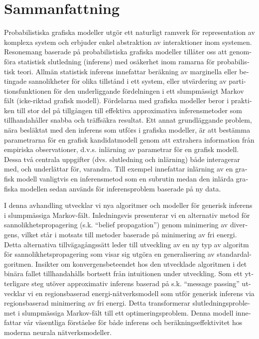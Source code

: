 \chapter{Sammanfattning}

\begin{otherlanguage}{swedish}
Probabilistiska grafiska modeller utgör ett naturligt ramverk för representation av komplexa system och erbjuder enkel abstraktion av interaktioner inom systemen.
Resonemang baserade på probabilistiska grafiska modeller tillåter oss att genomföra statistisk slutledning (inferens) med osäkerhet inom ramarna för probabilistisk teori. Allmän statistisk inferens innefattar beräkning av marginella eller betingade sannolikheter för olika tillstånd i ett system, eller utvärdering av partitionsfunktionen för den underliggande fördelningen i ett slumpmässigt Markov fält (icke-riktad grafisk modell). Fördelarna med grafiska modeller beror i praktiken till stor del på tillgången till effektiva approximativa inferensmetoder som tillhandahåller snabba och träffsäkra resultat. Ett annat grundläggande problem, nära besläktat med den inferens som utförs i grafiska modeller, är att bestämma parametrarna för en grafisk kandidatmodell genom att extrahera information från empiriska observationer, d.v.s. inlärning av parametrar för en grafisk modell. Dessa två centrala uppgifter (dvs. slutledning och inlärning) både interagerar med, och underlättar för, varandra. Till exempel innefattar inlärning av en grafisk modell vanligtvis en inferensmetod som en subrutin medan den inlärda grafiska modellen sedan används för inferensproblem baserade på ny data.

I denna avhandling utvecklar vi nya algoritmer och modeller för generisk inferens i slumpmässiga Markov-fält. Inledningsvis presenterar vi en alternativ metod för sannolikhetspropagering (s.k. ``belief propagation'') genom minimering av divergens, vilket står i motsats till metoder baserade på minimering av fri energi. Detta alternativa tillvägagångssätt leder till utveckling av en ny typ av algoritm för sannolikhetspropagering som visar sig utgöra en generalisering av standardalgoritmen. Insikter om konvergensbeteendet hos den utvecklade algoritmen i det binära fallet tillhandahålls bortsett från intuitionen under utveckling. Som ett ytterligare steg utöver approximativ inferens baserad på s.k. ``message passing'' utvecklar vi en regionsbaserad energi-nätverksmodell som utför generisk inferens via regionsbaserad  minimering av fri energi. Detta transformerar slutledningsproblemet i slumpmässiga Markov-fält till ett optimeringsproblem. Denna modell innefattar vår väsentliga förståelse för både inferens och beräkningseffektivitet hos moderna neurala nätverksmodeller.


\end{otherlanguage}
